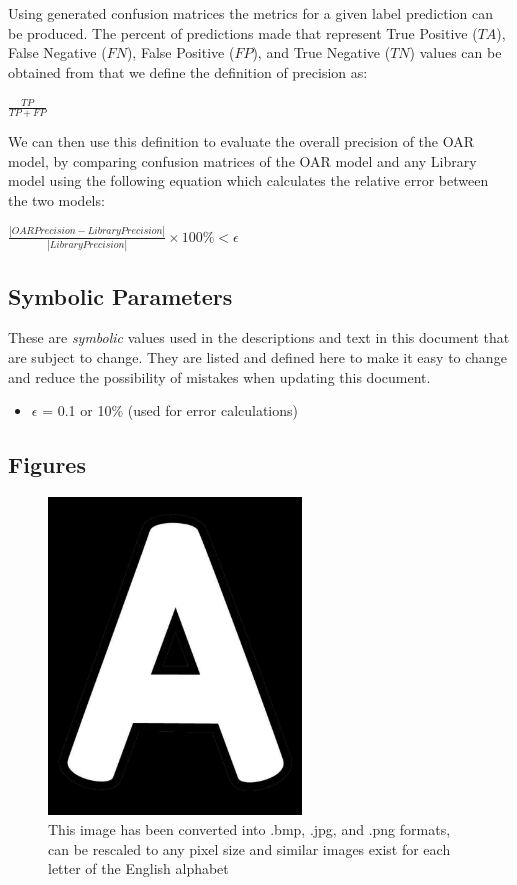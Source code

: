\documentclass[12pt, titlepage]{article}
\begin{document}
Using generated confusion matrices the metrics for a given label prediction can be produced. The percent of predictions made
that represent True Positive ($TA$), False Negative ($FN$), False Positive ($FP$), and True Negative ($TN$) values can be obtained 
from that we define the definition of precision as:

$\frac{TP}{TP + FP}$

We can then use this definition to evaluate the overall precision of the OAR model, by comparing confusion matrices of the OAR model 
and any Library model using the following equation which calculates the relative error between the two models:

$\frac{|OAR Precision - Library Precision|}{|Library Precision|} \times 100\% < \epsilon$

\subsection{Symbolic Parameters}

These are \textit{symbolic} values used in the descriptions and text in this document that are 
subject to change. They are listed and defined here to make it easy to change and reduce the
possibility of mistakes when updating this document.

\begin{itemize}
  \item $\epsilon$ = 0.1 or 10\% (used for error calculations)
\end{itemize}

\subsection{Figures}

\begin{figure}[h!]
  \begin{center}
   \includegraphics[width=0.6\textwidth]{A}
  \caption{This image has been converted into .bmp, .jpg, and .png formats, can be rescaled to any pixel size 
  and similar images exist for each letter of the English alphabet}
  \label{Fig_A} 
  \end{center}
  \end{figure}
\end{document}
